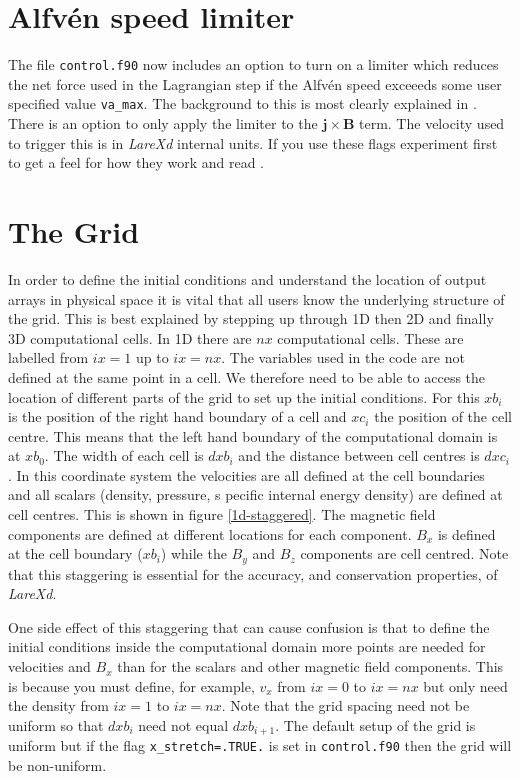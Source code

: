 \documentclass[11pt]{article}
\begin{document}
\section{Alfv\'en speed limiter}
The file \texttt{control.f90} now includes an option to turn on a limiter which reduces the net force used
in the Lagrangian step if the Alfv\'en speed exceeeds some user specified value \texttt{va\_max}. The background
to this is most clearly explained in \cite{gombosi:2002}. There is an option to only apply the limiter to the 
$\mathbf{j}\times \mathbf{B}$ term. The velocity used to trigger this is in {\it LareXd} internal units. If
you use these flags experiment first to get a feel for how they work and read \cite{gombosi:2002}.


\section{The Grid}
In order to define the initial conditions and understand the location of output arrays in physical space it is vital 
that all users know the underlying structure of the grid. This is best explained by stepping up through 1D then 2D and 
finally 3D computational cells. In 1D there are $nx$ computational cells. These are labelled from $ix=1$ up to $ix=nx$. 
The variables used in the code are not defined at the same point in a cell. We therefore need to be able to access the 
location of different parts of the grid to set up the initial conditions. For this $xb_i$ is the position of the right 
hand boundary of a cell and $xc_i$ the position of the cell centre. This means that the left hand boundary of the 
computational domain is at $xb_0$. The width of each cell is $dxb_i$ and the distance between cell centres is $dxc_i$. 
In this coordinate system the velocities are all defined at the cell boundaries and all scalars (density, pressure, s
pecific internal energy density) are defined at cell centres. This is shown in figure \ref{1d-staggered}. The magnetic 
field components are defined at different locations for each component. $B_x$ is defined at the cell boundary ($xb_i$) 
while the $B_y$ and $B_z$ components are cell centred. Note that this staggering is essential for the accuracy, and 
conservation properties, of {\it LareXd}.

One side effect of this staggering that can cause confusion is that to define the initial conditions inside the 
computational domain more points are needed for velocities and $B_x$ than for the scalars and other magnetic field 
components. This is because you must define, for example, $v_x$ from $ix=0$ to $ix=nx$ but only need the density 
from $ix=1$ to $ix=nx$. Note that the grid spacing need not be uniform so that $dxb_i$ need not equal $dxb_{i+1}$. 
The default setup of the grid is uniform but if the flag \texttt{x\_stretch=.TRUE.} is set in \texttt{control.f90} 
then the grid will be non-uniform.
\end{document}
